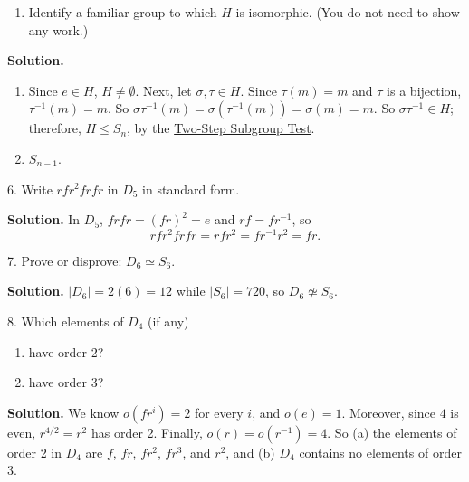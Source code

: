 \documentclass[10pt,]{book}
\theoremstyle{plain}
\theoremstyle{definition}
\theoremstyle{definition}
\theoremstyle{definition}
\theoremstyle{definition}
\numberwithin{equation}{section}
\begin{document}
\begin{exerciselist}
\begin{enumerate}[label=(\alph*)]
\item\hypertarget{li-378}{}Identify a familiar group to which \(H\) is isomorphic. (You do not need to show any work.)%
\end{enumerate}
%
\par\smallskip
\par\smallskip
\noindent\textbf{Solution.}\hypertarget{solution-45}{}\quad
\leavevmode%
\begin{enumerate}[label=(\alph*)]
\item\hypertarget{li-379}{}Since \(e\in H\), \(H\neq \emptyset\).  Next, let \(\sigma, \tau\in H\).  Since \(\tau(m)=m\) and \(\tau\) is a bijection, \(\tau^{-1}(m)=m\).  So \(\sigma \tau^{-1}(m)=\sigma(\tau^{-1}(m))=\sigma(m)=m\).  So \(\sigma \tau^{-1}\in H\); therefore, \(H\leq S_n\), by the \hyperref[twostep]{Two-Step Subgroup Test}.%
\item\hypertarget{li-380}{}\(S_{n-1}\).%
\end{enumerate}
%
\item[6.]\hypertarget{exercise-46}{}Write \(rfr^2frfr\) in \(D_5\) in standard form.%
\par\smallskip
\par\smallskip
\noindent\textbf{Solution.}\hypertarget{solution-46}{}\quad
In \(D_5\), \(frfr=(fr)^2=e\) and \(rf=fr^{-1}\), so%
\begin{equation*}
rfr^2frfr=rfr^2=fr^{-1}r^2=fr.
\end{equation*}
%
\item[7.]\hypertarget{exercise-47}{}Prove or disprove: \(D_6\simeq S_6\).%
\par\smallskip
\par\smallskip
\noindent\textbf{Solution.}\hypertarget{solution-47}{}\quad
\(|D_6|=2(6)=12\) while \(|S_6|=720\), so \(D_6\not\simeq S_6\).%
\item[8.]\hypertarget{exercise-48}{}Which elements of \(D_4\) (if any) \leavevmode%
\begin{enumerate}[label=(\alph*)]
\item\hypertarget{li-381}{}have order 2?%
\item\hypertarget{li-382}{}have order \(3\)?%
\end{enumerate}
%
\par\smallskip
\par\smallskip
\noindent\textbf{Solution.}\hypertarget{solution-48}{}\quad
We know \(o(fr^i)=2\) for every \(i\), and \(o(e)=1\). Moreover, since \(4\) is even, \(r^{4/2}=r^2\) has order 2. Finally, \(o(r)=o(r^{-1})=4\). So (a) the elements of order 2 in \(D_4\) are \(f\), \(fr\), \(fr^2\), \(fr^3\), and \(r^2\), and (b) \(D_4\) contains no elements of order 3.%

\end{exerciselist}
\end{document}
